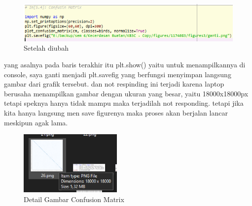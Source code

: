 \begin{figure}[H]
	\centering
	\includegraphics[width=12cm]{figures/1174083/figures3/error5.png}
	\caption{Setelah diubah}
\end{figure}
yang asalnya pada baris terakhir itu plt.show() yaitu untuk menampilkannya di console, saya ganti menjadi plt.savefig yang berfungsi menyimpan langsung gambar dari grafik tersebut. dan not respinding ini terjadi karena laptop berusaha menampilkan gambar dengan ukuran yang besar, yaitu 18000x18000px tetapi speknya hanya tidak mampu maka terjadilah not responding. tetapi jika kita hanya langsung men save figurenya maka proses akan berjalan lancar meskipun agak lama.
\begin{figure}[H]
	\centering
	\includegraphics[width=5cm]{figures/1174083/figures3/error6.png}
	\caption{Detail Gambar Confusion Matrix}
\end{figure}
\hfill\\

